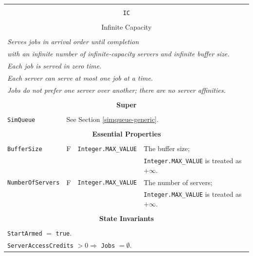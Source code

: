 \documentclass[12pt]{book}
\begin{document}
\begin{tabular}{|l|l|l|l|}
\hline
\multicolumn{4}{|c|}{} \\
\multicolumn{4}{|c|}{\lstinline[basicstyle=\large]{IC}} \\
\multicolumn{4}{|c|}{} \\
\multicolumn{4}{|c|}{Infinite Capacity} \\
\multicolumn{4}{|c|}{} \\
\hline
\multicolumn{4}{|l|}{\em Serves jobs in arrival order until completion} \\
\multicolumn{4}{|l|}{\em with an infinite number of infinite-capacity servers and infinite buffer size.} \\
\multicolumn{4}{|l|}{\em Each job is served in zero time.} \\
\multicolumn{4}{|l|}{\em Each server can serve at most one job at a time.} \\
\multicolumn{4}{|l|}{\em Jobs do not prefer one server over another; there are no server affinities.} \\
\hline
\multicolumn{4}{|c|}{} \\
\multicolumn{4}{|c|}{\bf Super} \\
\multicolumn{4}{|c|}{} \\
\hline
\lstinline|SimQueue| & \multicolumn{3}{|l|}{See Section \ref{simqueue-generic}.} \\
\hline
\multicolumn{4}{|c|}{} \\
\multicolumn{4}{|c|}{\bf Essential Properties} \\
\multicolumn{4}{|c|}{} \\
\hline
\lstinline|BufferSize|      & F & \lstinline|Integer.MAX_VALUE|
                            & The buffer size; \\
                        & & & \lstinline|Integer.MAX_VALUE| is treated as $+\infty$. \\
\hline
\lstinline|NumberOfServers| & F & \lstinline|Integer.MAX_VALUE|
                            & The number of servers; \\
                        & & & \lstinline|Integer.MAX_VALUE| is treated as $+\infty$. \\
\hline
\multicolumn{4}{|c|}{} \\
\multicolumn{4}{|c|}{\bf State  Invariants} \\
\multicolumn{4}{|c|}{} \\
\hline
\multicolumn{4}{|l|}{\lstinline|StartArmed| $=$ \lstinline|true|.} \\
\multicolumn{4}{|l|}{\lstinline|ServerAccessCredits| $> 0 \Rightarrow$ \lstinline|Jobs| $= \emptyset$.} \\

\end{tabular}
\end{document}
